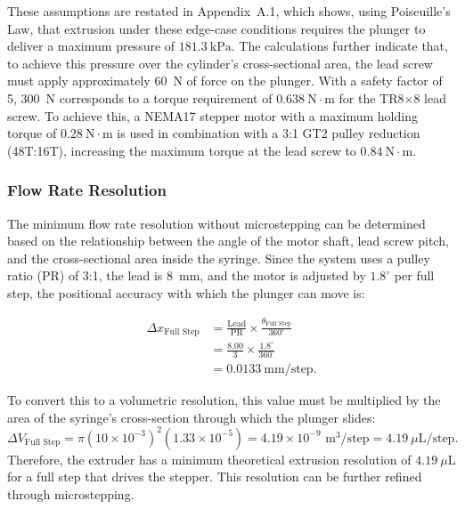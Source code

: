 These assumptions are restated in Appendix~A.1, which shows, using Poiseuille’s Law, that extrusion under these edge-case conditions requires the plunger to deliver a maximum pressure of $181.3~\si{\kilo\pascal}$. The calculations further indicate that, to achieve this pressure over the cylinder’s cross-sectional area, the lead screw must apply approximately \SI{60}{N} of force on the plunger. With a safety factor of 5, \SI{300}{N} corresponds to a torque requirement of $0.638~\text{N}\cdot\text{m}$ for the TR8$\times$8 lead screw. To achieve this, a NEMA17 stepper motor with a maximum holding torque of $0.28~\text{N}\cdot\text{m}$ is used in combination with a 3:1 GT2 pulley reduction (48T:16T), increasing the maximum torque at the lead screw to $0.84~\text{N}\cdot\text{m}$.


\subsubsection*{Flow Rate Resolution}
The minimum flow rate resolution without microstepping can be determined based on the relationship between the angle of the motor shaft, lead screw pitch, and the cross-sectional area inside the syringe. Since the system uses a pulley ratio (PR) of 3:1, the lead is \SI{8}{mm}, and the motor is adjusted by $1.8^{\circ}$ per full step, the positional accuracy with which the plunger can move is:

\begin{align*}
\Delta x_{\text{Full Step}} &= \frac{\text{Lead}}{\text{PR}} \times \frac{\theta_{\text{Full Step}}}{360^{\circ}} \\
&=\frac{8.00}{3}\times \frac{1.8^\circ}{360^\circ} \\
&= 0.0133~\text{mm}/\text{step}.
\end{align*}

\noindent To convert this to a volumetric resolution, this value must be multiplied by the area of the syringe's cross-section through which the plunger slides:
$$\Delta V_\text{Full Step} =\pi \left(10 \times 10^{-3}\right)^2 (1.33 \times 10^{-5})=4.19\times10^{-9} \,\,\text{m}^3/\text{step} =\boxed{4.19~\mu\text{L}/\text{step}} .
$$
Therefore, the extruder has a minimum theoretical extrusion resolution of $4.19~\mu\text{L}$ for a full step that drives the stepper. This resolution can be further refined through microstepping.

